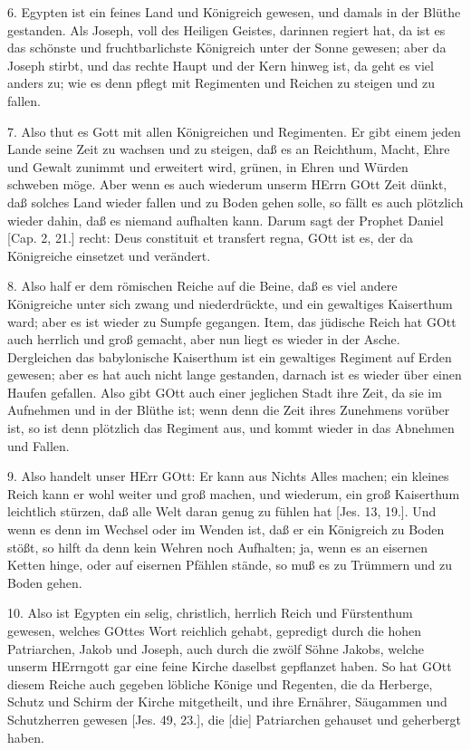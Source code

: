 6. Egypten ist ein feines Land und Königreich gewesen, und damals in der Blüthe gestanden. Als Joseph, voll des Heiligen Geistes, darinnen regiert hat, da ist es das schönste und fruchtbarlichste Königreich unter der Sonne gewesen; aber da Joseph stirbt, und das rechte Haupt und der Kern hinweg ist, da geht es viel anders zu; wie es denn pflegt mit Regimenten und Reichen zu steigen und zu fallen.

7. Also thut es Gott mit allen Königreichen und Regimenten. Er gibt einem jeden Lande seine Zeit zu wachsen und zu steigen, daß es an Reichthum, Macht, Ehre und Gewalt zunimmt und erweitert wird, grünen, in Ehren und Würden schweben möge. Aber wenn es auch wiederum unserm HErrn GOtt Zeit dünkt, daß solches Land wieder fallen und zu Boden gehen solle, so fällt es auch plötzlich wieder dahin, daß es niemand aufhalten kann. Darum sagt der Prophet Daniel [Cap. 2, 21.] recht: Deus constituit et transfert regna, GOtt ist es, der da Königreiche einsetzet und verändert.

8. Also half er dem römischen Reiche auf die Beine, daß es viel andere Königreiche unter sich zwang und niederdrückte, und ein gewaltiges Kaiserthum ward; aber es ist wieder zu Sumpfe gegangen. Item, das jüdische Reich hat GOtt
auch herrlich und groß gemacht, aber nun liegt es wieder in der Asche. Dergleichen das babylonische Kaiserthum ist ein gewaltiges Regiment auf Erden gewesen; aber es hat auch nicht lange gestanden, darnach ist es wieder über einen Haufen gefallen. Also gibt GOtt auch einer jeglichen Stadt ihre Zeit, da sie im Aufnehmen und in der Blüthe ist; wenn denn die Zeit ihres Zunehmens vorüber ist, so ist denn plötzlich das Regiment aus, und kommt wieder in das Abnehmen und Fallen.

9. Also handelt unser HErr GOtt: Er kann aus Nichts Alles machen; ein kleines Reich kann er wohl weiter und groß machen, und wiederum, ein groß Kaiserthum leichtlich stürzen, daß alle Welt daran genug zu fühlen hat [Jes. 13, 19.]. Und wenn es denn im Wechsel oder im Wenden ist, daß er ein Königreich zu Boden stößt, so hilft da denn kein Wehren noch Aufhalten; ja, wenn es an eisernen Ketten hinge, oder auf eisernen Pfählen stände, so muß es zu Trümmern und zu Boden gehen.

10. Also ist Egypten ein selig, christlich, herrlich Reich und Fürstenthum gewesen, welches GOttes Wort reichlich gehabt, gepredigt durch die hohen Patriarchen, Jakob und Joseph, auch durch die zwölf Söhne Jakobs, welche unserm HErrngott gar eine feine Kirche daselbst gepflanzet haben. So hat GOtt diesem Reiche auch gegeben löbliche Könige und Regenten, die da Herberge, Schutz und Schirm der Kirche mitgetheilt, und ihre Ernährer, Säugammen und Schutzherren gewesen [Jes. 49, 23.], die [die] Patriarchen gehauset und geherbergt haben.

